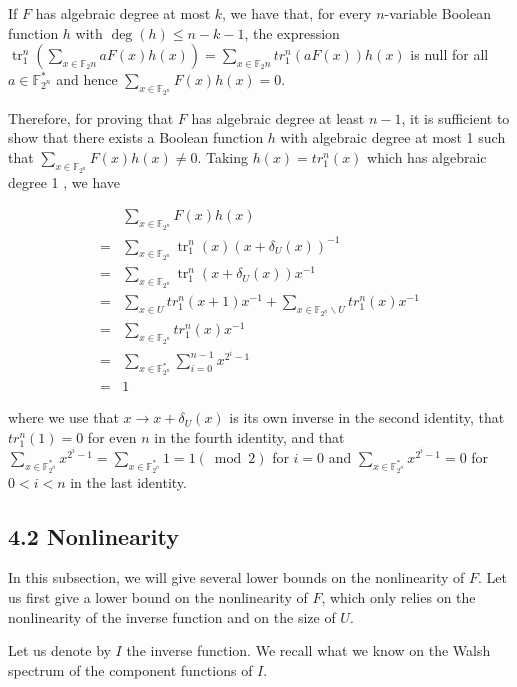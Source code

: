 \documentclass[10pt]{article}
\begin{document}
If $F$ has algebraic degree at most $k$, we have that, for every $n$-variable Boolean function $h$ with $\operatorname{deg}(h) \leq n-k-1$, the expression $\operatorname{tr}_{1}^{n}\left(\sum_{x \in \mathbb{F}_{2} n} a F(x) h(x)\right)=\sum_{x \in \mathbb{F}_{2} n} t r_{1}^{n}(a F(x)) h(x)$ is null for all $a \in \mathbb{F}_{2^{n}}^{*}$ and hence $\sum_{x \in \mathbb{F}_{2^{n}}} F(x) h(x)=0$.

Therefore, for proving that $F$ has algebraic degree at least $n-1$, it is sufficient to show that there exists a Boolean function $h$ with algebraic degree at most 1 such that $\sum_{x \in \mathbb{F}_{2^{n}}} F(x) h(x) \neq 0$. Taking $h(x)=t r_{1}^{n}(x)$ which has algebraic degree 1 , we have

$$
\begin{aligned}
& \sum_{x \in \mathbb{F}_{2^{n}}} F(x) h(x) \\
= & \sum_{x \in \mathbb{F}_{2^{n}}} \operatorname{tr}_{1}^{n}(x)\left(x+\delta_{U}(x)\right)^{-1} \\
= & \sum_{x \in \mathbb{F}_{2^{n}}} \operatorname{tr}_{1}^{n}\left(x+\delta_{U}(x)\right) x^{-1} \\
= & \sum_{x \in U} t r_{1}^{n}(x+1) x^{-1}+\sum_{x \in \mathbb{F}_{2^{n}} \backslash U} t r_{1}^{n}(x) x^{-1} \\
= & \sum_{x \in \mathbb{F}_{2^{n}}} t r_{1}^{n}(x) x^{-1} \\
= & \sum_{x \in \mathbb{F}_{2^{n}}^{*}} \sum_{i=0}^{n-1} x^{2^{i}-1} \\
= & 1
\end{aligned}
$$

where we use that $x \rightarrow x+\delta_{U}(x)$ is its own inverse in the second identity, that $t r_{1}^{n}(1)=0$ for even $n$ in the fourth identity, and that $\sum_{x \in \mathbb{F}_{2^{n}}^{*}} x^{2^{i}-1}=\sum_{x \in \mathbb{F}_{2^{n}}^{*}} 1=1(\bmod 2)$ for $i=0$ and $\sum_{x \in \mathbb{F}_{2^{n}}^{*}} x^{2^{i}-1}=0$ for $0<i<n$ in the last identity.

\subsection*{4.2 Nonlinearity}
In this subsection, we will give several lower bounds on the nonlinearity of $F$. Let us first give a lower bound on the nonlinearity of $F$, which only relies on the nonlinearity of the inverse function and on the size of $U$.

Let us denote by $I$ the inverse function. We recall what we know on the Walsh spectrum of the component functions of $I$.
\end{document}
